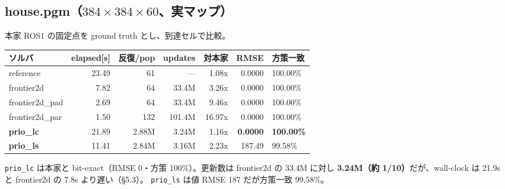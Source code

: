 \documentclass[11pt]{article}
\begin{document}
\subsection{house.pgm（$384\times384\times60$、実マップ）}
本家 ROS1 の固定点を ground truth とし、到達セルで比較。
\begin{center}
\begin{tabular}{lrrrrrl}
\toprule
ソルバ & elapsed[s] & 反復/pop & updates & 対本家 & RMSE & 方策一致 \\
\midrule
reference         & 23.49 & 61    & ---    & 1.08x  & 0.0000 & 100.00\% \\
frontier2d        & 7.82  & 64    & 33.4M  & 3.26x  & 0.0000 & 100.00\% \\
frontier2d\_pad   & 2.69  & 64    & 33.4M  & 9.46x  & 0.0000 & 100.00\% \\
frontier2d\_par   & 1.50  & 132   & 101.4M & 16.97x & 0.0000 & 100.00\% \\
\textbf{prio\_lc} & 21.89 & 2.88M & 3.24M  & 1.16x  & \textbf{0.0000} & \textbf{100.00\%} \\
\textbf{prio\_ls} & 11.41 & 2.84M & 3.16M  & 2.23x  & 187.49 & 99.58\% \\
\bottomrule
\end{tabular}
\end{center}
\texttt{prio\_lc} は本家と bit-exact（RMSE 0・方策 100\%）。更新数は frontier2d の 33.4M に対し
\textbf{3.24M（約 1/10）}だが、wall-clock は 21.9s と frontier2d の 7.8s より遅い（\S5.3）。
\texttt{prio\_ls} は値 RMSE 187 だが方策一致 99.58\%。
\end{document}
